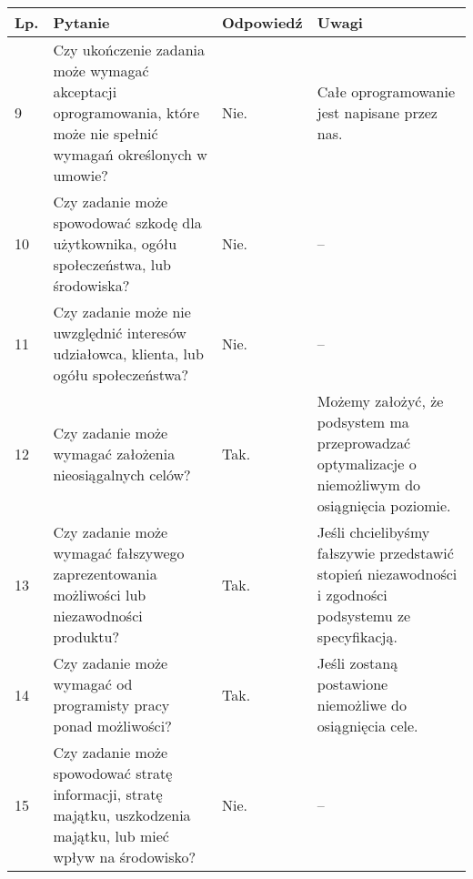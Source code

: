 \documentclass[11pt,oneside,a4paper,titlepage,onecolumn]{article}
\begin{document}
\begin{tabularx}{\textwidth}{|l|X|l|X|}
    \hline
    Lp. & Pytanie & Odpowiedź & Uwagi \\ \hline

	9
	& Czy ukończenie zadania może wymagać akceptacji oprogramowania, które może
    nie spełnić wymagań określonych w umowie?
	& Nie.
	& Całe oprogramowanie jest napisane przez nas.
	\\\hline

	10
	& Czy zadanie może spowodować szkodę dla użytkownika, ogółu społeczeństwa, lub
    środowiska?
	& Nie.
	& --
	\\\hline

	11
	& Czy zadanie może nie uwzględnić interesów udziałowca, klienta, lub ogółu
    społeczeństwa?
	& Nie.
	& --
	\\\hline

	12
	& Czy zadanie może wymagać założenia nieosiągalnych celów?
	& Tak.
	& Możemy założyć, że podsystem ma przeprowadzać optymalizacje o niemożliwym
    do osiągnięcia poziomie.
	\\\hline

	13
	& Czy zadanie może wymagać fałszywego zaprezentowania możliwości lub
    niezawodności produktu?
	& Tak.
	& Jeśli chcielibyśmy fałszywie przedstawić stopień niezawodności i
    zgodności podsystemu ze specyfikacją.
	\\\hline

	14
	& Czy zadanie może wymagać od programisty pracy ponad możliwości?
	& Tak.
	& Jeśli zostaną postawione niemożliwe do osiągnięcia cele.
	\\\hline

	15
	& Czy zadanie może spowodować stratę informacji, stratę majątku, uszkodzenia
    majątku, lub mieć wpływ na środowisko?
	& Nie.
	& --
	\\\hline
\end{tabularx}
\end{document}

